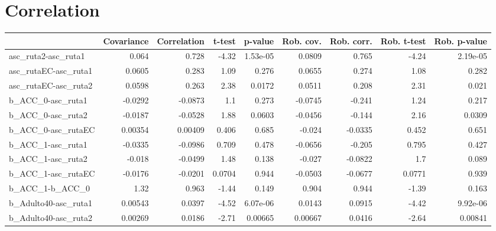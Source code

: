 \section{Correlation}
\begin{tabular}{lrrrrrrrr}
\toprule
{} &  Covariance &  Correlation &    t-test &  p-value &  Rob. cov. &  Rob. corr. &  Rob. t-test &  Rob. p-value \\
\midrule
asc\_ruta2-asc\_ruta1        &       0.064 &        0.728 &     -4.32 & 1.53e-05 &     0.0809 &       0.765 &        -4.24 &      2.19e-05 \\
asc\_rutaEC-asc\_ruta1       &      0.0605 &        0.283 &      1.09 &    0.276 &     0.0655 &       0.274 &         1.08 &         0.282 \\
asc\_rutaEC-asc\_ruta2       &      0.0598 &        0.263 &      2.38 &   0.0172 &     0.0511 &       0.208 &         2.31 &         0.021 \\
b\_ACC\_0-asc\_ruta1          &     -0.0292 &      -0.0873 &       1.1 &    0.273 &    -0.0745 &      -0.241 &         1.24 &         0.217 \\
b\_ACC\_0-asc\_ruta2          &     -0.0187 &      -0.0528 &      1.88 &   0.0603 &    -0.0456 &      -0.144 &         2.16 &        0.0309 \\
b\_ACC\_0-asc\_rutaEC         &     0.00354 &      0.00409 &     0.406 &    0.685 &     -0.024 &     -0.0335 &        0.452 &         0.651 \\
b\_ACC\_1-asc\_ruta1          &     -0.0335 &      -0.0986 &     0.709 &    0.478 &    -0.0656 &      -0.205 &        0.795 &         0.427 \\
b\_ACC\_1-asc\_ruta2          &      -0.018 &      -0.0499 &      1.48 &    0.138 &     -0.027 &     -0.0822 &          1.7 &         0.089 \\
b\_ACC\_1-asc\_rutaEC         &     -0.0176 &      -0.0201 &    0.0704 &    0.944 &    -0.0503 &     -0.0677 &       0.0771 &         0.939 \\
b\_ACC\_1-b\_ACC\_0            &        1.32 &        0.963 &     -1.44 &    0.149 &      0.904 &       0.944 &        -1.39 &         0.163 \\
b\_Adulto40-asc\_ruta1       &     0.00543 &       0.0397 &     -4.52 & 6.07e-06 &     0.0143 &      0.0915 &        -4.42 &      9.92e-06 \\
b\_Adulto40-asc\_ruta2       &     0.00269 &       0.0186 &     -2.71 &  0.00665 &    0.00667 &      0.0416 &        -2.64 &       0.00841 \\

\end{tabular}
